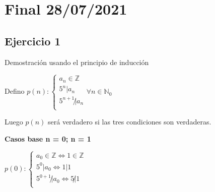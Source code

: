 
\usepackage{caratula}
\usepackage{enumerate}
\usepackage{hyperref}
\usepackage{graphicx}
\usepackage{amsfonts}
\usepackage{enumitem}
\usepackage{amsmath}

\decimalpoint
\hypersetup{colorlinks=true, linkcolor=black, urlcolor=blue}
\setlength{\parindent}{0em}
\setlength{\parskip}{0.5em}
\setcounter{tocdepth}{3} %
\setcounter{section}{0} %
\renewcommand{\thesubsubsection}{\thesubsection.\Alph{subsubsection}}
\graphicspath{ {images/} }





\maketitle
\newpage

\tableofcontents
\newpage

\section{Final 28/07/2021}

\subsection{Ejercicio 1}

Demostración usando el principio de inducción

Defino $ p(n): \begin{cases}
    a_n \in \mathbb{Z} \\
    5^n | a_n \\
    5^{n+1} \not | a_n \\
\end{cases} \forall n \in \mathbb{N}_0$

Luego $p(n)$ será verdadero si las tres condiciones son verdaderas.

\textbf{Casos base n = 0; n = 1}

$ p(0): \begin{cases}
    a_0 \in \mathbb{Z} \iff 1 \in \mathbb{Z} \\
    5^0 | a_0 \iff 1 | 1 \\
    5^{0+1} \not | a_0 \iff 5 \not | 1 \\
\end{cases} $

